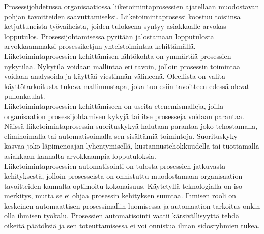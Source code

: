 \documentclass[finnish,12pt,a4paper,pdftex]{article}
\begin{document}
Prosessijohdetussa organisaatiossa liiketoimintaprosessien ajatellaan muodostavan pohjan tavoitteiden saavuttamiseksi. Liiketoimintaprosessi koostuu toisiinsa ketjuttuneista työvaiheista, joiden tuloksena syntyy asiakkaalle arvokas lopputulos. Prosessijohtamisessa pyritään jalostamaan lopputulosta arvokkaammaksi prosessiketjun yhteistoimintaa kehittämällä.\\

\noindent Liiketoimintaprosessien kehittämisen lähtökohta on ymmärtää prosessien nykytilaa. Nykytila voidaan mallintaa eri tavoin, jolloin prosessin toimintaa voidaan analysoida ja käyttää viestinnän välineenä. Oleellista on valita käyttötarkoitusta tukeva mallinnustapa, joka tuo esiin tavoitteen edessä olevat pullonkaulat.\\

\noindent Liiketoimintaprosessien kehittämiseen on useita etenemismalleja, joilla organisaation prosessijohtamisen kykyjä tai itse prosesseja voidaan parantaa. Näissä liiketoimintaprosessin suorituskykyä halutaan parantaa joko tehostamalla, eliminoimalla tai automatisoimalla sen sisältämiä toimintoja. Suorituskyky kasvaa joko läpimenoajan lyhentymisellä, kustannustehokkuudella tai tuottamalla asiakkaan kannalta arvokkaampia lopputuloksia. \\

\noindent Liiketoimintaprosessien automatisointi on tulosta prosessien jatkuvasta kehityksestä, jolloin prosesseista on onnistuttu muodostamaan organisaation tavoitteiden kannalta optimoitu kokonaisuus. Käytetyllä teknologialla on iso merkitys, mutta se ei ohjaa prosessin kehityksen suuntaa. Ihmisen rooli on keskeinen automaattisen prosessimallin luomisessa ja automaation tarkoitus onkin olla ihmisen työkalu. Prosessien automatisointi vaatii kärsivällisyyttä tehdä oikeitä päätöksiä ja sen toteuttamisessa ei voi onnistua ilman sidosryhmien tukea.


\end{document}
